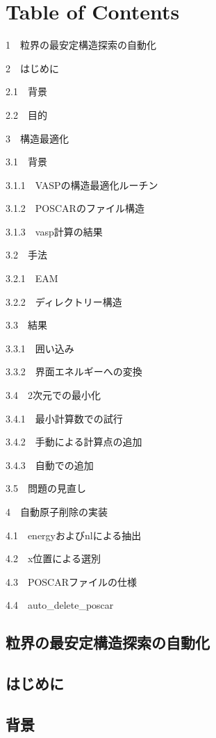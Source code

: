 \chapter{Table of Contents}\label{table-of-contents}

{1~~}粒界の最安定構造探索の自動化

{2~~}はじめに

{2.1~~}背景

{2.2~~}目的

{3~~}構造最適化

{3.1~~}背景

{3.1.1~~}VASPの構造最適化ルーチン

{3.1.2~~}POSCARのファイル構造

{3.1.3~~}vasp計算の結果

{3.2~~}手法

{3.2.1~~}EAM

{3.2.2~~}ディレクトリー構造

{3.3~~}結果

{3.3.1~~}囲い込み

{3.3.2~~}界面エネルギーへの変換

{3.4~~}2次元での最小化

{3.4.1~~}最小計算数での試行

{3.4.2~~}手動による計算点の追加

{3.4.3~~}自動での追加

{3.5~~}問題の見直し

{4~~}自動原子削除の実装

{4.1~~}energyおよびnlによる抽出

{4.2~~}x位置による選別

{4.3~~}POSCARファイルの仕様

{4.4~~}auto\_delete\_poscar

    \section{粒界の最安定構造探索の自動化}\label{ux7c92ux754cux306eux6700ux5b89ux5b9aux69cbux9020ux63a2ux7d22ux306eux81eaux52d5ux5316}

    \section{はじめに}\label{ux306fux3058ux3081ux306b}

    \section{背景}\label{ux80ccux666f}

